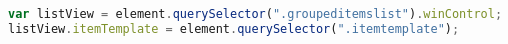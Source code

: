 \begin{lstlisting}[language= Javascript,caption=Template bei der Listview registrieren., label={lst:getitemtemplate}]
var listView = element.querySelector(".groupeditemslist").winControl;
listView.itemTemplate = element.querySelector(".itemtemplate");
\end{lstlisting} 